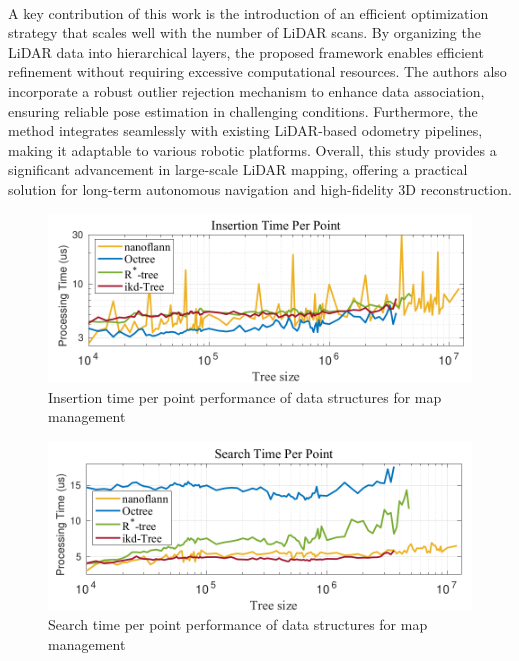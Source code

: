 \paragraph{}  
A key contribution of this work is the introduction of an efficient optimization strategy that scales well with the number of LiDAR scans. By organizing the LiDAR data into hierarchical layers, the proposed framework enables efficient refinement without requiring excessive computational resources. The authors also incorporate a robust outlier rejection mechanism to enhance data association, ensuring reliable pose estimation in challenging conditions. Furthermore, the method integrates seamlessly with existing LiDAR-based odometry pipelines, making it adaptable to various robotic platforms. Overall, this study provides a significant advancement in large-scale LiDAR mapping, offering a practical solution for long-term autonomous navigation and high-fidelity 3D reconstruction.


\begin{figure}[h]
	\centering
	\includegraphics[width=\textwidth]{images/insert.png}
	\caption{ Insertion time per point performance of data structures for map management}
	\label{fig:insertion}
\end{figure}
\begin{figure}[ht!]
	\centering
	\includegraphics[width=\textwidth]{images/search.png}
	\caption{ Search time per point performance of data structures for map management}
	\label{fig:searching}
\end{figure}

